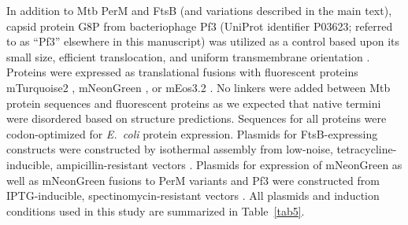 \documentclass[pdflatex,sn-nature]{sn-jnl}%
\newcommand\ec{\textit{E.~coli}}
\newcommand\mtb{Mtb}
\begin{document}
In addition to \mtb{} PerM and FtsB (and variations described in the main text), capsid protein G8P from bacteriophage Pf3 (UniProt identifier P03623; referred to as ``Pf3'' elsewhere in this manuscript) was utilized as a control based upon its small size, efficient translocation, and uniform transmembrane orientation \citep{kieferNegativelyChargedAmino1997}.
Proteins were expressed as translational fusions with fluorescent proteins mTurquoise2 \citep{goedhartStructureguidedEvolutionCyan2012}, mNeonGreen \citep{shanerBrightMonomericGreen2013}, or mEos3.2 \cite{zhangRationalDesignTrue2012}.
No linkers were added between \mtb{} protein sequences and fluorescent proteins as we expected that native termini were disordered based on structure predictions.
Sequences for all proteins were codon-optimized for \ec{} protein expression.
Plasmids for FtsB-expressing constructs were constructed by isothermal assembly from low-noise, tetracycline-inducible, ampicillin-resistant vectors \citep{henselPlasmidbasedEscherichiaColi2017}.
Plasmids for expression of mNeonGreen as well as mNeonGreen fusions to PerM variants and Pf3 were constructed from IPTG-inducible, spectinomycin-resistant vectors \citep{silvaPlasmidsIndependentlyTunable2019}.
All plasmids and induction conditions used in this study are summarized in Table~\ref{tab5}.
\end{document}
